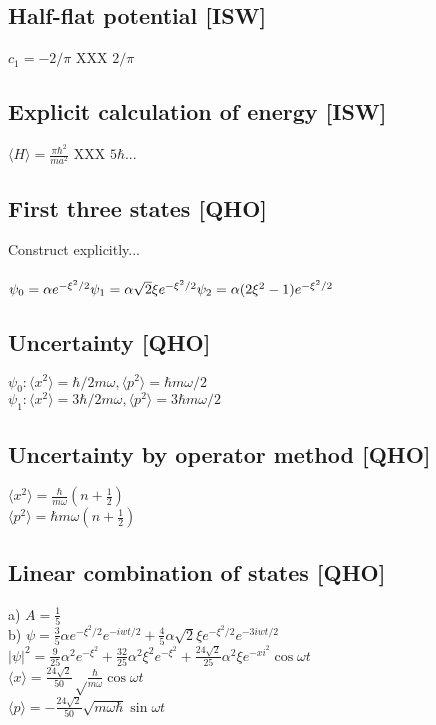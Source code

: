 \documentclass{article}
\newcommand{\half}{\frac{1}{2}}
\newcommand{\<}{\langle}
\renewcommand{\>}{\rangle}
\begin{document}
\subsection{Half-flat potential [ISW]}

$c_1 = -2/\pi$ XXX $2/\pi$

\subsection{Explicit calculation of energy [ISW]}

$\<H\> = \frac{\pi \hbar^2}{ma^2}$ XXX $5\hbar...$

\subsection{First three states [QHO]}

Construct explicitly...
\\ \\
$\psi_0 = \alpha e^{-\xi^2/2} \\
\psi_1 = \alpha\sqrt 2 \xi e^{-\xi^2/2} \\
\psi_2 = \alpha(2\xi^2 - 1) e^{-\xi^2/2}$

\subsection{Uncertainty [QHO]}

$\psi_0: \<x^2\> = \hbar/2m\omega, \<p^2\> = \hbar m \omega / 2$ \\
$\psi_1: \<x^2\> = 3\hbar/2m\omega, \<p^2\> = 3 \hbar m \omega / 2$

\subsection{Uncertainty by operator method [QHO]}

$\<x^2\> = \frac{\hbar}{m\omega} (n+\half)$ \\
$\<p^2\> = \hbar m \omega (n + \half)$

\subsection{Linear combination of states [QHO]}

a) $A = \frac{1}{5}$ \\
b) $\psi = \frac{3}{5} \alpha e^{-\xi^2/2}e^{-iwt/2} + \frac{4}{5} \alpha \sqrt 2 \xi e^{-\xi^2/2}e^{-3iwt/2}$ \\
$|\psi|^2 = \frac{9}{25} \alpha^2 e^{-\xi^2} + \frac{32}{25} \alpha^2 \xi^2 e^{-\xi^2} + \frac{24\sqrt 2}{25}\alpha^2\xi e^{-xi^2} \cos\omega t$ \\
$\<x\> = \frac{24\sqrt 2}{50} \sqrt\frac{\hbar}{m\omega} \cos\omega t$ \\
$\<p\> = -\frac{24\sqrt 2}{50}\sqrt{m\omega \hbar} \sin\omega t$
\end{document}
